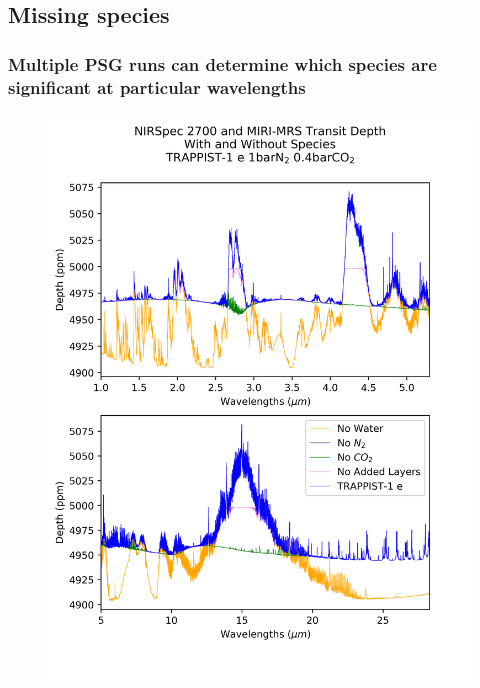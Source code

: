 \documentclass{beamer}
\begin{document}
\subsection{Missing species}
\begin{frame}
    \frametitle{Multiple PSG runs can determine which species are significant at
    particular wavelengths}
    \begin{figure}
        \includegraphics[height=0.95\textheight]{spectra/nirmiri_without_species.png}
    \end{figure}
\end{frame}
\end{document}
